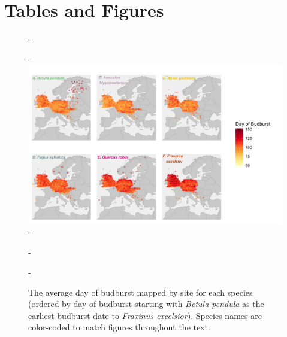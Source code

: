 \documentclass{article}\usepackage[]{graphicx}\usepackage[]{color}
\begin{document}
  




\section*{Tables and Figures} 

{\begin{figure} [H]
  -\begin{center}
  -\includegraphics[width=14cm]{..//analyses/figures/BB_base.png}
  -\caption{The average day of budburst mapped by site for each species (ordered by day of budburst starting with \textit{Betula pendula} as the earliest budburst date to \textit{Fraxinus excelsior}). Species names are color-coded to match figures throughout the text. }\label{fig:bbmap}
  -\end{center}
  -\end{figure}}
  
\end{document}
